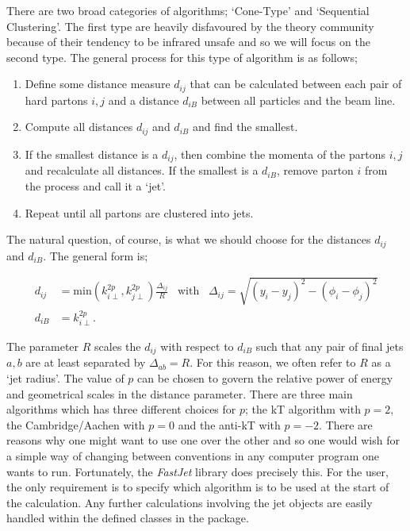 There are two broad categories of algorithms; `Cone-Type' and `Sequential Clustering'. The first type are heavily disfavoured by the theory community because of their tendency to be infrared unsafe and so we will focus on the second type. The general process for this type of algorithm is as follows;

\begin{enumerate}
\item{Define some distance measure $d_{ij}$ that can be calculated between each pair of hard partons $i,j$ and a distance $d_{iB}$ between all particles and the beam line.}
\item{Compute all distances $d_{ij}$ and $d_{iB}$ and find the smallest.}
\item{If the smallest distance is a $d_{ij}$, then combine the momenta of the partons $i, j$ and recalculate all distances. If the smallest is a $d_{iB}$, remove parton $i$ from the process and call it a `jet'.}
\item{Repeat until all partons are clustered into jets.}
\end{enumerate}

The natural question, of course, is what we should choose for the distances $d_{ij}$ and $d_{iB}$. The general form is;

\begin{equation}
\begin{split}
d_{ij} &= \text{min}\left(k_{i \perp}^{2p},k_{j \perp}^{2p} \right) \frac{\Delta_{ij}}{R} \hspace{10pt} \text{with} \hspace{10pt} \Delta_{ij} = \sqrt{(y_i - y_j)^2 - (\phi_i - \phi_j)^2} \\
d_{iB} &= k_{i \perp}^{2p}.
\end{split}
\end{equation}

The parameter $R$ scales the $d_{ij}$ with respect to $d_{iB}$ such that any pair of final jets $a, b$ are at least separated by $\Delta_{ab} = R$. For this reason, we often refer to $R$ as a `jet radius'. The value of $p$ can be chosen to govern the relative power of energy and geometrical scales in the distance parameter. There are three main algorithms which has three different choices for $p$; the kT algorithm with $p =2$, the Cambridge/Aachen with $p=0$ and the anti-kT with $p = -2$. There are reasons why one might want to use one over the other and so one would wish for a simple way of changing between conventions in any computer program one wants to run. Fortunately, the \emph{FastJet} library \cite{Cacciari2012} does precisely this. For the user, the only requirement is to specify which algorithm is to be used at the start of the calculation. Any further calculations involving the jet objects are easily handled within the defined classes in the package. 

